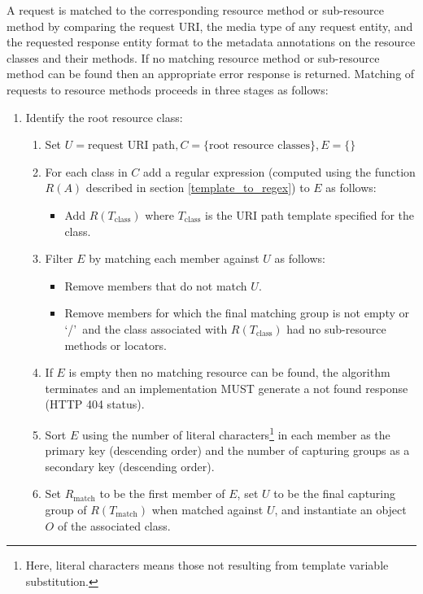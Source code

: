 A request is matched to the corresponding resource method or sub-resource method by comparing the request URI, the media type of any request entity, and the requested response entity format to the metadata annotations on the resource classes and their methods. If no matching resource method or sub-resource method can be found then an appropriate error response is returned. Matching of requests to resource methods proceeds in three stages as follows:

\begin{enumerate}
\item Identify the root resource class:

\begin{enumerate}
\item Set $U=\mbox{request URI path}, C=\{\mbox{root resource classes}\}, E=\{\}$

\item For each class in $C$ add a regular expression (computed using the function $R(A)$ described in section \ref{template_to_regex}) to $E$ as follows:
\begin{itemize}
\item Add $R(T_{\mbox{class}})$ where $T_{\mbox{class}}$ is the URI path template specified for the class.
\end{itemize}

\item Filter $E$ by matching each member against $U$ as follows:
\begin{itemize}
\item Remove members that do not match $U$.
\item Remove members for which the final matching group is not empty or \lq/\rq\ and the class associated with $R(T_{\mbox{class}})$ had no sub-resource methods or locators.
\end{itemize}

\item If $E$ is empty then no matching resource can be found, the algorithm terminates and an implementation MUST generate a not found response (HTTP 404 status).

\item Sort $E$ using the number of literal characters\footnote{Here, literal characters means those not resulting from template variable substitution.} in each member as the primary key (descending order) and the number of capturing groups as a secondary key (descending order).

\item Set $R_{\mbox{match}}$ to be the first member of $E$, set $U$ to be the final capturing group of $R(T_{\mbox{match}})$ when matched against $U$, and instantiate an object $O$ of the associated class.


\end{enumerate}
\end{enumerate}
